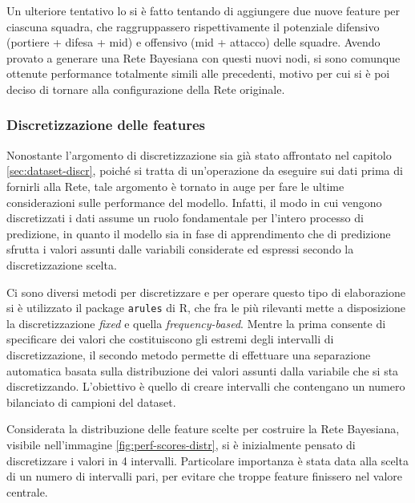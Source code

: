 \documentclass[hidelinks, 12pt]{article}
\begin{document}
\vspace{3ex}

Un ulteriore tentativo lo si è fatto tentando di aggiungere due nuove feature per ciascuna squadra, che raggruppassero rispettivamente il potenziale difensivo (portiere + difesa + mid) e offensivo (mid + attacco) delle squadre. Avendo provato a generare una Rete Bayesiana con questi nuovi nodi, si sono comunque ottenute performance totalmente simili alle precedenti, motivo per cui si è poi deciso di tornare alla configurazione della Rete originale.


\subsubsection{Discretizzazione delle features}
\label{sec:perf-discret}

Nonostante l'argomento di discretizzazione sia già stato affrontato nel capitolo \ref{sec:dataset-discr}, poiché si tratta di un'operazione da eseguire sui dati prima di fornirli alla Rete, tale argomento è tornato in auge per fare le ultime considerazioni sulle performance del modello. Infatti, il modo in cui vengono discretizzati i dati assume un ruolo fondamentale per l'intero processo di predizione, in quanto il modello sia in fase di apprendimento che di predizione sfrutta i valori assunti dalle variabili considerate ed espressi secondo la discretizzazione scelta.

Ci sono diversi metodi per discretizzare e per operare questo tipo di elaborazione si è utilizzato il package \texttt{arules} di R, che fra le più rilevanti mette a disposizione la discretizzazione \textit{fixed} e quella \textit{frequency-based}. Mentre la prima consente di specificare dei valori che costituiscono gli estremi degli intervalli di discretizzazione, il secondo metodo permette di effettuare una separazione automatica basata sulla distribuzione dei valori assunti dalla variabile che si sta discretizzando. L'obiettivo è quello di creare intervalli che contengano un numero bilanciato di campioni del dataset.

Considerata la distribuzione delle feature scelte per costruire la Rete Bayesiana, visibile nell'immagine \ref{fig:perf-scores-distr}, si è inizialmente pensato di discretizzare i valori in 4 intervalli. Particolare importanza è stata data alla scelta di un numero di intervalli pari, per evitare che troppe feature finissero nel valore centrale.
\end{document}
